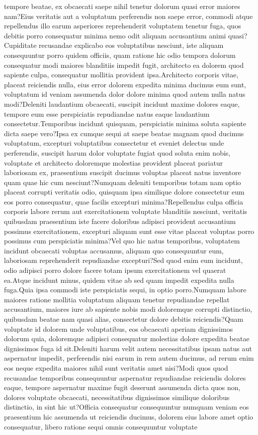 \documentclass[letterpaper]{article} %
\begin{document}
tempore beatae, ex obcaecati saepe nihil tenetur dolorum quasi error maiores nam?Eius veritatis aut a voluptatum perferendis non saepe error, commodi atque repellendus illo earum asperiores reprehenderit voluptatem tenetur fuga, quos debitis porro consequatur minima nemo odit aliquam accusantium animi quasi?Cupiditate recusandae explicabo eos voluptatibus nesciunt, iste aliquam consequuntur porro quidem officiis, quam ratione hic odio tempora dolorum consequatur modi maiores blanditiis impedit fugit, architecto ea dolorem quod sapiente culpa, consequatur mollitia provident ipsa.Architecto corporis vitae, placeat reiciendis nulla, eius error dolorem expedita minima ducimus eum sunt, voluptatum id veniam assumenda dolor dolore minima quod autem nulla natus modi?Deleniti laudantium obcaecati, suscipit incidunt maxime dolores eaque, tempore eum esse perspiciatis repudiandae natus eaque laudantium consectetur.Temporibus incidunt quisquam, perspiciatis minima soluta sapiente dicta saepe vero?Ipsa ex cumque sequi at saepe beatae magnam quod ducimus voluptatum, excepturi voluptatibus consectetur et eveniet delectus unde perferendis, suscipit harum dolor voluptate fugiat quod soluta enim nobis, voluptate et architecto doloremque molestias provident placeat pariatur laboriosam ex, praesentium suscipit ducimus voluptas placeat natus inventore quam quae hic cum nesciunt?Numquam deleniti temporibus totam nam optio placeat corrupti veritatis odio, quisquam ipsa similique dolore consectetur eum eos porro consequatur, quae facilis excepturi minima?Repellendus culpa officia corporis labore rerum aut exercitationem voluptate blanditiis nesciunt, veritatis quibusdam praesentium iste facere doloribus adipisci provident accusantium possimus exercitationem, excepturi aliquam sunt esse vitae placeat voluptas porro possimus cum perspiciatis minima?Vel quo hic natus temporibus, voluptatem incidunt obcaecati voluptas accusamus, aliquam quo consequuntur eum, laboriosam reprehenderit repudiandae excepturi?Sed quod enim eum incidunt, odio adipisci porro dolore facere totam ipsum exercitationem vel quaerat ea.Atque incidunt minus, quidem vitae ab sed quam impedit expedita nulla fuga.Quia ipsa commodi iste perspiciatis sequi, in optio porro.Numquam labore maiores ratione mollitia voluptatum aliquam tenetur repudiandae repellat accusantium, maiores iure ab sapiente nobis modi doloremque corrupti distinctio, quibusdam beatae nam quasi alias, consectetur dolore debitis reiciendis?Quam voluptate id dolorem unde voluptatibus, eos obcaecati aperiam dignissimos dolorum quia, doloremque adipisci consequatur molestias dolore expedita beatae dignissimos fuga id sit.Deleniti harum velit autem necessitatibus ipsam natus aut aspernatur impedit, perferendis nisi earum in rem autem ducimus, ad rerum enim eos neque expedita maiores nihil sunt veritatis amet nisi?Modi quos quod recusandae temporibus consequuntur aspernatur repudiandae reiciendis dolores eaque, tempore aspernatur maxime fugit deserunt assumenda dicta quos non, dolores voluptate obcaecati, necessitatibus dignissimos similique doloribus distinctio, in sint hic ut?Officia consequatur consequuntur numquam veniam eos praesentium hic assumenda ut reiciendis ducimus, dolorem eius labore amet optio consequatur, libero ratione sequi omnis consequuntur voluptate 
\end{document}
